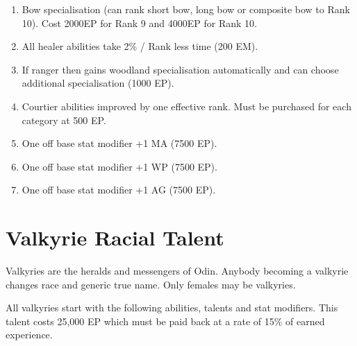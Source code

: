 \documentclass[a4paper]{article}
\begin{document}
\begin{multicols*}{3}
\begin{enumerate}
\begin{talent}{Resist Temperature}
\begin{effects}
The Adept is most immune to climatic extremes of temperature from
arctic cold to desert heat whether generated naturally or by magic.
They apparent temperature will be 2\textdegree{} / Rank less extreme,
therefore depending on rank they are less likely to suffer exposure,
frostbite, wind-chill, heat stress, hypothermia or hyperthermia, and
their fatigue loss is unaffected by temperature.  If the Adept is
attacked by fire, ice, heat or cold (whether magical or not) then the
damage points are reduced by 1 (+ 1 / 5 Ranks).
\end{effects}
\end{talent}

\item Bow specialisation (can rank short bow, long bow or composite
bow to Rank 10).  Cost 2000EP for Rank 9 and 4000EP for Rank 10.

\item All healer abilities take 2\% / Rank less time (200 EM).

\item If ranger then gains woodland specialisation automatically and
can choose additional specialisation (1000 EP).

\item Courtier abilities improved by one effective rank.  Must be
purchased for each category at 500 EP.

\item One off base stat modifier +1 MA (7500 EP).

\item One off base stat modifier +1 WP (7500 EP).

\item One off base stat modifier +1 AG (7500 EP).

\end{enumerate}

\newpage

\section{Valkyrie Racial Talent}

Valkyries are the heralds and messengers of Odin.  Anybody becoming a
valkyrie changes race and generic true name.  Only females may be
valkyries.

All valkyries start with the following abilities, talents and stat
modifiers.  This talent costs 25,000 EP which must be paid back at a
rate of 15\% of earned experience.


\end{multicols*}
\end{document}
